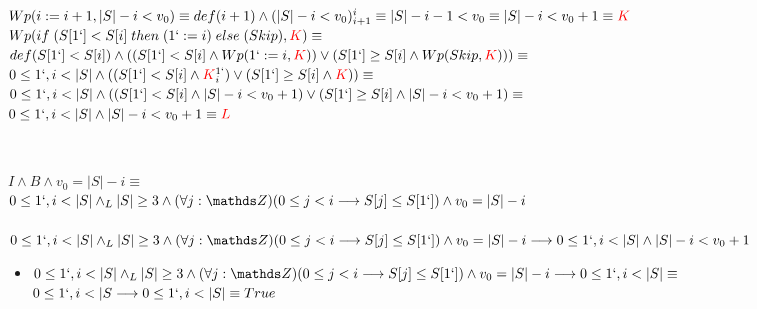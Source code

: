 \documentclass[10pt,a4paper]{article}
\begin{document}
\begin{enumerate}
    $Wp(i:=i+1,|S|-i<v_0) \equiv def(i+1) \land (|S|-i<v_0)^i_{i+1} \equiv |S|-i-1<v_0 \equiv |S|-i<v_0+1 \equiv \textcolor{red}{K}$\\

    $Wp(if\;(S[1`]<S[i] \; then \; (1`:=i) \; else \; (Skip), \textcolor{red}{K}) \equiv$\\
    
    $ def(S[1`]<S[i]) \land (     (S[1`]<S[i] \land Wp(1`:=i, \textcolor{red}{K}))       \lor           (S[1`]\geq S[i] \land Wp(Skip,\textcolor{red}{K}))       ) \equiv$ \\

    $0\leq 1`,i<|S| \land ( (S[1`]<S[i] \land \textcolor{red}{K}^{1`}_i)     \lor (S[1`]\geq S[i] \land \textcolor{red}{K}) ) \equiv$\\

    $0\leq 1`,i<|S| \land ( (S[1`]<S[i] \land  |S|-i<v_0+1) \lor (S[1`]\geq S[i] \land |S|-i<v_0+1) \equiv$\\

    $0\leq 1`,i<|S| \land |S|-i<v_0+1  \equiv \textcolor{red}{L}$

     \\


    $I \land B \land v_0 = |S|-i \equiv$\\

    $0 \leq 1`,i<|S|  \land_L |S| \geq 3 \land (\forall j: \ent)(0\leq j < i \longrightarrow S[j]\leq S[1`]) \land v_0 =|S|-i$\\

    \\

    $0 \leq 1`,i<|S|  \land_L |S| \geq 3 \land (\forall j: \ent)(0\leq j < i \longrightarrow S[j]\leq S[1`]) \land v_0 =|S|-i \longrightarrow 0\leq 1`,i<|S| \land |S|-i<v_0+1 $

    \begin{itemize}
        \item $0 \leq 1`,i<|S|  \land_L |S| \geq 3 \land (\forall j: \ent)(0\leq j < i \longrightarrow S[j]\leq S[1`]) \land v_0 =|S|-i \longrightarrow 0\leq 1`,i<|S| \equiv $\\

         $0 \leq 1`,i<|S \longrightarrow 0\leq 1`,i<|S| \equiv True $\\
         


\end{itemize}
\end{enumerate}
\end{document}
